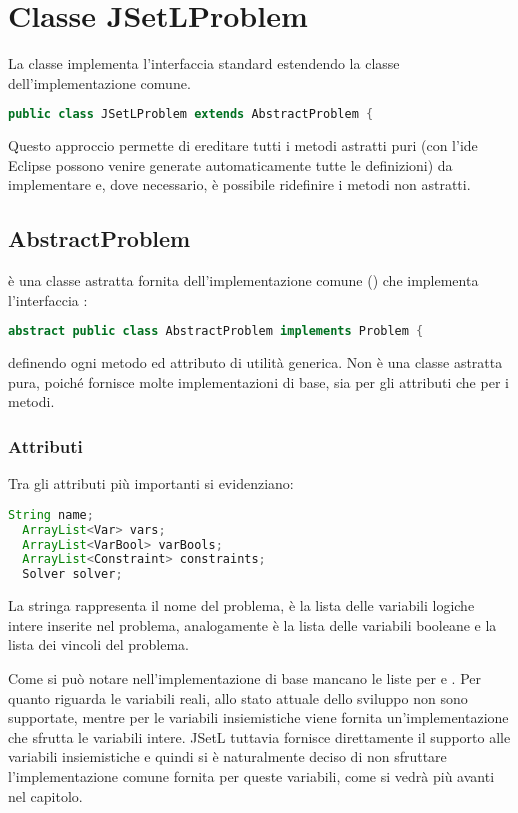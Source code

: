 \section{Classe JSetLProblem}\label{problem}
La classe  implementa l'interfaccia standard 
estendendo la classe  dell'implementazione comune.
\begin{lstlisting}[language = Java]
public class JSetLProblem extends AbstractProblem {
\end{lstlisting}

Questo approccio permette di ereditare tutti i metodi astratti puri (con
l'ide Eclipse possono venire generate automaticamente tutte le definizioni) da 
implementare e, dove necessario, è possibile ridefinire i metodi non astratti.

\subsection{AbstractProblem}
 è una classe astratta fornita dell'implementazione 
comune () che implementa l'interfaccia
:
\begin{lstlisting}[language = Java]
abstract public class AbstractProblem implements Problem {
\end{lstlisting}
definendo ogni metodo ed attributo di utilità generica. Non è una classe
astratta pura, poiché fornisce molte implementazioni di base, sia per gli 
attributi che per i metodi.

\subsubsection{Attributi}
Tra gli attributi più importanti si evidenziano:
\begin{lstlisting}[language = Java]
  String name;
  ArrayList<Var> vars;
  ArrayList<VarBool> varBools;
  ArrayList<Constraint> constraints;
  Solver solver;
\end{lstlisting}
La stringa  rappresenta il nome del problema,  è
la lista delle variabili logiche intere inserite nel problema, analogamente
 è la lista delle variabili booleane e  la
lista dei vincoli del problema.

Come si può notare nell'implementazione di base mancano le liste per 
 e . Per quanto riguarda le variabili reali, allo
stato attuale dello sviluppo non sono supportate, mentre per le variabili 
insiemistiche viene fornita un'implementazione che sfrutta le variabili intere.
JSetL tuttavia fornisce direttamente il supporto alle variabili insiemistiche 
e quindi si è naturalmente deciso di non sfruttare l'implementazione comune 
fornita per queste variabili, come si vedrà più avanti nel capitolo.

